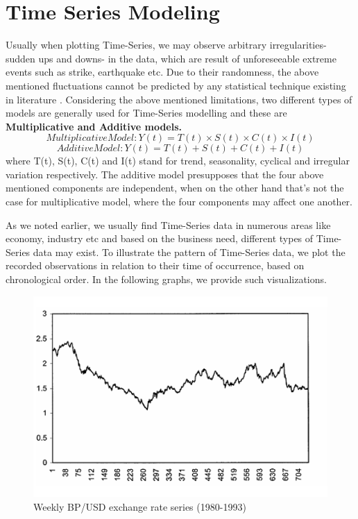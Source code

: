 \section{Time Series Modeling}
\par Usually when plotting Time-Series, we may observe arbitrary irregularities- sudden ups and downs- in the data, which are result of unforeseeable extreme events such as strike, earthquake etc. Due to their randomness, the above mentioned fluctuations cannot be predicted by any statistical technique existing in literature \cite{madsen2007time}. Considering the above mentioned limitations, two different types of models are generally used for Time-Series modelling and these are \textbf{Multiplicative and Additive models.}
$$Multiplicative Model: Y(t) = T(t)× S(t)×C(t)× I(t)$$
$$Additive Model: Y(t) = T(t) + S(t) + C(t) + I(t)$$ 
where T(t), S(t), C(t) and I(t) stand for trend, seasonality, cyclical and irregular variation respectively. The additive model presupposes that the four above mentioned components are independent, when on the other hand that's not the case for multiplicative model, where the four components may affect one another.
\par
As we noted earlier, we usually find Time-Series data in numerous areas like economy, industry etc and based on the business need, different types of Time-Series data may exist. To illustrate the pattern of Time-Series data, we plot the recorded observations in relation to their time of occurrence, based on chronological order. In the following graphs, we provide such visualizations. 
\begin{figure}[htbp]
\centering
\includegraphics[width=0.8\linewidth]{project/fd.PNG}

\caption{Weekly BP/USD exchange rate series (1980-1993)}
\end{figure}
